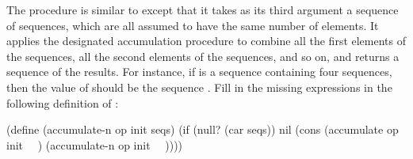 \begin{exercise}
	\label{Exercise 2.36}
	The procedure  is similar to  except that it takes as its third argument a sequence of sequences, which are all assumed to have the same number of elements.
	It applies the designated accumulation procedure to combine all the first elements of the sequences, all the second elements of the sequences, and so on, and returns a sequence of the results.
	For instance, if  is a sequence containing four sequences,  then the value of  should be the sequence .
	Fill in the missing expressions in the following definition of :
	\begin{scheme}
	  (define (accumulate-n op init seqs)
	    (if (null? (car seqs))
	        nil
	        (cons (accumulate op init ~~)
	              (accumulate-n op init ~~))))
	\end{scheme}
\end{exercise}



